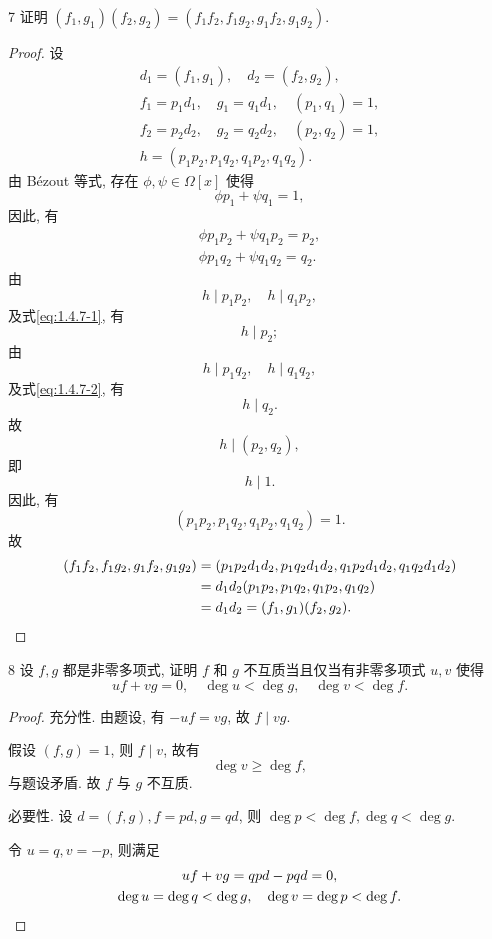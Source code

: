 \begin{ex}{7}\label{ex:1.4.7}
    证明 \((f_1,g_1)(f_2,g_2)=(f_1f_2,f_1g_2,g_1f_2,g_1g_2)\).
\end{ex}

\begin{proof}
    设
    \begin{gather*}
        d_1=(f_1,g_1),\quad d_2=(f_2,g_2),\\
        f_1=p_1d_1,\quad g_1=q_1d_1,\quad(p_1,q_1)=1,\\
        f_2=p_2d_2,\quad g_2=q_2d_2,\quad(p_2,q_2)=1,\\
        h=(p_1p_2,p_1q_2,q_1p_2,q_1q_2).
    \end{gather*}
    由 B\'ezout 等式, 存在 \(\phi,\psi\in\Omega[x]\) 使得
    \[
    \phi p_1+\psi q_1=1,
    \]
    因此, 有
    \begin{gather}
        \phi p_1p_2+\psi q_1p_2=p_2,\label{eq:1.4.7-1}\\
        \phi p_1q_2+\psi q_1q_2=q_2.\label{eq:1.4.7-2}
    \end{gather}
    由
    \[
    h\mid p_1p_2,\quad h\mid q_1p_2,
    \]
    及式\eqref{eq:1.4.7-1}, 有
    \[
    h\mid p_2;
    \]
    由
    \[
    h\mid p_1q_2,\quad h\mid q_1q_2,
    \]
    及式\eqref{eq:1.4.7-2}, 有
    \[
    h\mid q_2.
    \]
    故
    \[
    h\mid(p_2,q_2),
    \]
    即
    \[
    h\mid1.
    \]
    因此, 有
    \[
    (p_1p_2,p_1q_2,q_1p_2,q_1q_2)=1.
    \]
    故
    \begin{align*}
        (f_1f_2,f_1g_2,g_1f_2,g_1g_2)&=(p_1p_2d_1d_2,p_1q_2d_1d_2,q_1p_2d_1d_2,q_1q_2d_1d_2)\\
        &=d_1d_2(p_1p_2,p_1q_2,q_1p_2,q_1q_2)\\
        &=d_1d_2=(f_1,g_1)(f_2,g_2).\qedhere
    \end{align*}
\end{proof}

\begin{ex}{8}\label{ex:1.4.8}
    设 \(f,g\) 都是非零多项式, 证明 \(f\) 和 \(g\) 不互质当且仅当有非零多项式 \(u,v\) 使得
    \[
    uf+vg=0,\quad\deg u<\deg g,\quad\deg v<\deg f.
    \]
\end{ex}

\begin{proof}
    充分性. 由题设, 有 \(-uf=vg\), 故 \(f\mid vg\).

    假设 \((f,g)=1\), 则 \(f\mid v\), 故有
    \[
    \deg v\geq\deg f,
    \]
    与题设矛盾. 故 \(f\) 与 \(g\) 不互质.
    
    必要性. 设 \(d=(f,g),f=pd,g=qd\), 则 \(\deg p<\deg f,\deg q<\deg g\).

    令 \(u=q,v=-p\), 则满足
    \begin{gather*}
        uf+vg=qpd-pqd=0,\\
        \deg u=\deg q<\deg g,\quad\deg v=\deg p<\deg f.\qedhere
    \end{gather*}
\end{proof}

